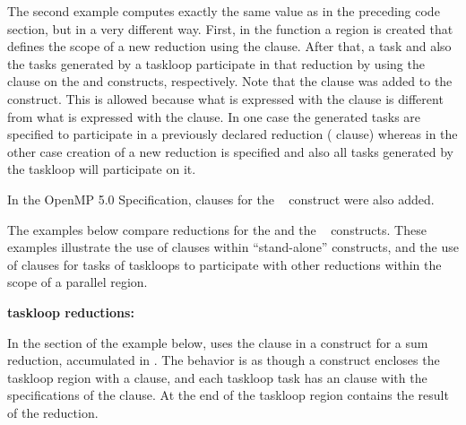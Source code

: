 The second example computes exactly the same value as in the preceding  code section,
but in a very different way.
First, in the  function a  region is created 
that defines the scope of a new reduction using the  clause.
After that, a task and also the tasks generated by a taskloop participate in 
that reduction by using the  clause on the 
and  constructs, respectively. 
Note that the  clause was added to the  construct.
This is allowed because what is expressed with the  clause
is different from what is expressed with the  clause.
In one case the generated tasks are specified to participate in a previously 
declared reduction ( clause) whereas in the other case
creation of a new reduction is specified and also all tasks generated 
by the taskloop will participate on it.


In the OpenMP 5.0 Specification,  clauses for the
~ construct were also added. 

The examples below compare reductions for the  and the ~ constructs.
These examples illustrate the use of  clauses within 
``stand-alone''  constructs, and the use of  clauses for tasks of taskloops to participate
with other reductions within the scope of a parallel region.

\textbf{taskloop reductions:}

In the  section of the example below, 
 uses the  clause 
in a  construct for a sum reduction, accumulated in . 
The behavior is as though a  construct encloses the 
taskloop region with a  clause, and each taskloop
task has an  clause with the specifications 
of the  clause.
At the end of the taskloop region  contains the result of the reduction.

